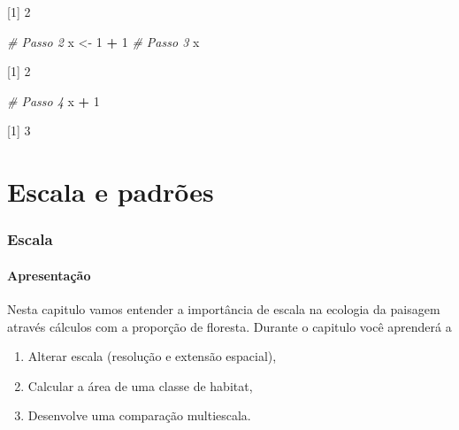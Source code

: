 \documentclass[
]{article}
\newenvironment{Shaded}{\begin{snugshade}}{\end{snugshade}}
\newcommand{\CommentTok}[1]{\textcolor[rgb]{0.56,0.35,0.01}{\textit{#1}}}
\newcommand{\DecValTok}[1]{\textcolor[rgb]{0.00,0.00,0.81}{#1}}
\newcommand{\NormalTok}[1]{#1}
\newcommand{\OtherTok}[1]{\textcolor[rgb]{0.56,0.35,0.01}{#1}}
\newcommand{\SpecialCharTok}[1]{\textcolor[rgb]{0.81,0.36,0.00}{\textbf{#1}}}
\providecommand{\tightlist}{%
  \setlength{\itemsep}{0pt}\setlength{\parskip}{0pt}}
\begin{document}
{[}1{]} 2

\begin{Shaded}
\begin{Highlighting}[]

\CommentTok{\# Passo 2}
\NormalTok{x }\OtherTok{\textless{}{-}} \DecValTok{1} \SpecialCharTok{+} \DecValTok{1}
\CommentTok{\# Passo 3}
\NormalTok{x}
\end{Highlighting}
\end{Shaded}

{[}1{]} 2

\begin{Shaded}
\begin{Highlighting}[]

\CommentTok{\# Passo 4}
\NormalTok{x }\SpecialCharTok{+} \DecValTok{1}
\end{Highlighting}
\end{Shaded}

{[}1{]} 3

\newpage{}

\hypertarget{part-escala-e-padruxf5es}{%
\part{Escala e padrões}\label{part-escala-e-padruxf5es}}

\newpage{}

\hypertarget{escala}{%
\section{Escala}\label{escala}}

\hypertarget{apresentauxe7uxe3o}{%
\subsection{Apresentação}\label{apresentauxe7uxe3o}}

Nesta capitulo vamos entender a importância de escala na ecologia da paisagem através cálculos com a proporção de floresta. Durante o capitulo você aprenderá a

\begin{enumerate}
\def\labelenumi{\arabic{enumi}.}
\tightlist
\item
  Alterar escala (resolução e extensão espacial),\\
\item
  Calcular a área de uma classe de habitat,\\
\item
  Desenvolve uma comparação multiescala.
\end{enumerate}
\end{document}
